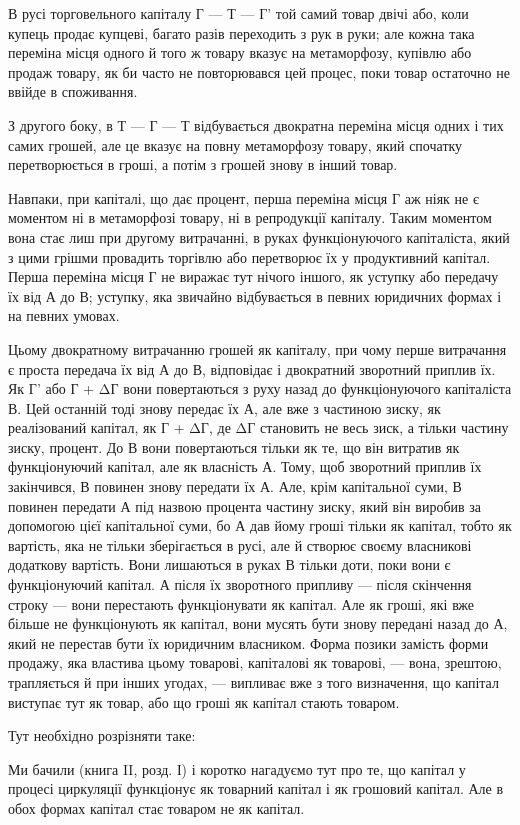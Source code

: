 В русі торговельного капіталу Г — Т — Г' той самий товар
двічі або, коли купець продає купцеві, багато разів переходить
з рук в руки; але кожна така переміна місця одного й того ж
товару вказує на метаморфозу, купівлю або продаж товару,
як би часто не повторювався цей процес, поки товар остаточно
не ввійде в споживання.

З другого боку, в Т — Г — Т відбувається двократна переміна
місця одних і тих самих грошей, але це вказує на повну
метаморфозу товару, який спочатку перетворюється в гроші,
а потім з грошей знову в інший товар.

Навпаки, при капіталі, що дає процент, перша переміна місця
Г аж ніяк не є моментом ні в метаморфозі товару, ні в репродукції
капіталу. Таким моментом вона стає лиш при другому
витрачанні, в руках функціонуючого капіталіста, який з цими
грішми провадить торгівлю або перетворює їх у продуктивний
капітал. Перша переміна місця Г не виражає тут нічого іншого,
як уступку або передачу їх від А до В; уступку, яка звичайно
відбувається в певних юридичних формах і на певних умовах.

Цьому двократному витрачанню грошей як капіталу, при
чому перше витрачання є проста передача їх від А до В, відповідає
і двократний зворотний приплив їх. Як Г' або Г + ΔГ вони
повертаються з руху назад до функціонуючого капіталіста В.
Цей останній тоді знову передає їх А, але вже з частиною
зиску, як реалізований капітал, як Г + ΔГ, де ΔГ становить
не весь зиск, а тільки частину зиску, процент. До В вони повертаються
тільки як те, що він витратив як функціонуючий
капітал, але як власність А. Тому, щоб зворотний приплив їх
закінчився, В повинен знову передати їх А. Але, крім капітальної
суми, В повинен передати А під назвою процента частину
зиску, який він виробив за допомогою цієї капітальної суми,
бо А дав йому гроші тільки як капітал, тобто як вартість, яка
не тільки зберігається в русі, але й створює своєму власникові
додаткову вартість. Вони лишаються в руках В тільки доти,
поки вони є функціонуючий капітал. А після їх зворотного
припливу — після скінчення строку — вони перестають функціонувати
як капітал. Але як гроші, які вже більше не функціонують
як капітал, вони мусять бути знову передані назад до А,
який не перестав бути їх юридичним власником.
Форма позики замість форми продажу, яка властива цьому
товарові, капіталові як товарові, — вона, зрештою, трапляється
й при інших угодах, — випливає вже з того визначення, що
капітал виступає тут як товар, або що гроші як капітал стають
товаром.

Тут необхідно розрізняти таке:

Ми бачили (книга II, розд. І) і коротко нагадуємо тут про те,
що капітал у процесі циркуляції функціонує як товарний капітал
і як грошовий капітал. Але в обох формах капітал стає
товаром не як капітал.
